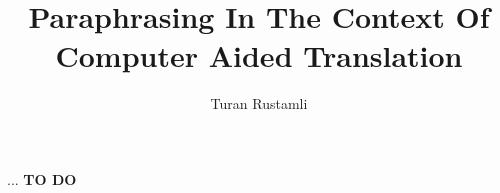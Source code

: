\documentclass[msc,ai,logo,sansheadings]{infthesis}
\title{Paraphrasing In The Context Of \\ Computer Aided Translation}
\author{Turan Rustamli}
\begin{document}
\begin{preliminary}

\maketitle

\begin{acknowledgements}
... \textbf{TO DO}
\end{acknowledgements}

\standarddeclaration


\tableofcontents


\end{preliminary}









\appendix






\end{document}
